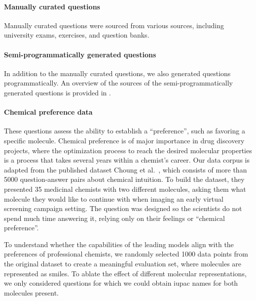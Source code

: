 \documentclass[11pt, oneside]{article}
\begin{document}
\begin{refsegment}
\paragraph{Manually curated questions}
Manually curated questions were sourced from various sources, including university exams, exercises, and question banks.


\paragraph{Semi-programmatically generated questions}
In addition to the manually curated questions, we also generated questions programmatically. An overview of the sources of the semi-programmatically generated questions is provided in .



\paragraph{Chemical preference data}

These questions assess the ability to establish a \enquote{preference}, such as favoring a specific molecule. Chemical preference is of major importance in drug discovery projects, where the optimization process to reach the desired molecular properties is a process that takes several years within a chemist's career.
Our data corpus is adapted from the published dataset Choung et al.\ \autocite{Choung_2023}, which consists of more than 5000 question-answer pairs about chemical intuition. To build the dataset, they presented 35 medicinal chemists with two different molecules, asking them what molecule they would like to continue with when imaging an early virtual screening campaign setting. The question was designed so the scientists do not spend much time answering it, relying only on their feelings or \enquote{chemical preference}.

To understand whether the capabilities of the leading models align with the preferences of professional chemists, we randomly selected 1000 data points from the original dataset to create a meaningful evaluation set, where molecules are represented as \gls{smiles}.
To ablate the effect of different molecular representations, we only considered questions for which we could obtain \gls{iupac} names for both molecules present.



\end{refsegment}
\end{document}
